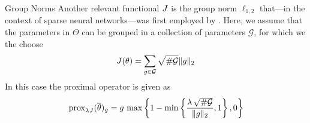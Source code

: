 %
%
\begin{example}{Group Norms}{}
Another relevant functional $J$ is the group norm $\ell_{1,2}$ that---in the context of sparse neural networks---was first employed by \cite{scardapane2017group}. Here, we assume that the parameters in $\Theta$ can be grouped in a collection of parameters $\mathcal{G}$, for which we the choose
%
\begin{align*}
J(\theta) = \sum_{g\in\mathcal{G}} \sqrt{\# \mathcal{G}} \|g\|_2
\end{align*}
%
In this case the proximal operator is given as
%
\begin{align*}
\,\mathrm{prox}_{\lambda J}(\overline\theta)_g = g \, 
\max\left\{1- \min\left\{
\frac{\lambda\,\sqrt{\# \mathcal{G}}}{\|g\|_2}
,1 \right\}
,0\right\}
\end{align*}
\end{example}
%
%
%
%
%
%
